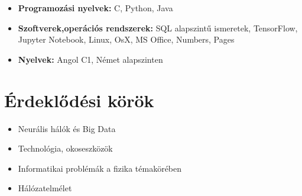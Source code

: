 \documentclass[11pt,a4paper,sans]{moderncv}
\begin{document}
\begin{itemize}

\item \textbf{Programozási nyelvek:} C, Python, Java

\vspace{6pt}

\item \textbf{Szoftverek,operációs rendszerek:}   SQL alapszintű ismeretek, TensorFlow, Jupyter Notebook, Linux, OsX, MS Office, Numbers,  Pages

\vspace{6pt}

\item \textbf{Nyelvek:} Angol C1,  Német alapszinten



\end{itemize}

\section{Érdeklődési körök}


\begin{itemize}
\item{}Neurális hálók és Big Data
\item{}Technológia, okoseszközök
\item{}Informatikai problémák a fizika témakörében
\item{}Hálózatelmélet







\end{itemize}


\vspace{6pt}
 



\nocite{*}

\end{document}
